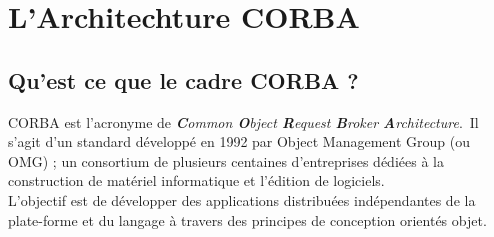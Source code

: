 \chapter{L'Architechture CORBA}

    \section{Qu'est ce que le cadre CORBA ?}

    \par CORBA est l’acronyme de \textit{\textbf{C}ommon \textbf{O}bject \textbf{R}equest \textbf{B}roker \textbf{A}rchitecture}. Il s’agit d’un standard développé en 1992 par Object Management Group (ou OMG) ; un consortium de plusieurs centaines d’entreprises dédiées à la construction de matériel informatique et l’édition de logiciels.\\
    L’objectif est de développer des applications distribuées indépendantes de la plate-forme et du langage à travers des principes de conception orientés objet.\\
    
    